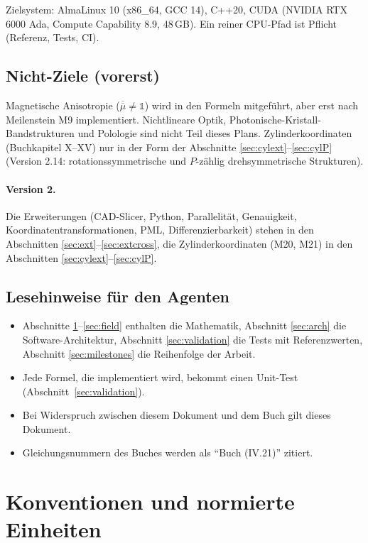 Zielsystem: AlmaLinux 10 (x86\_64, GCC 14), C++20, CUDA (NVIDIA RTX 6000 Ada,
Compute Capability 8.9, 48\,GB). Ein reiner CPU-Pfad ist Pflicht (Referenz, Tests, CI).

\subsection{Nicht-Ziele (vorerst)}
Magnetische Anisotropie ($\overline{\overline\mu}\neq\mathbb 1$) wird in den Formeln mitgeführt, aber erst
nach Meilenstein M9 implementiert. Nichtlineare Optik, Photonische-Kristall-Bandstrukturen
und Polologie sind nicht Teil dieses Plans. Zylinderkoordinaten (Buchkapitel X--XV) nur in der Form der
Abschnitte \ref{sec:cylext}--\ref{sec:cylP} (Version 2.14: rotationssymmetrische und $P$-zählig drehsymmetrische Strukturen).

\paragraph{Version 2.} Die Erweiterungen (CAD-Slicer, Python, Parallelität, Genauigkeit, Koordinatentransformationen,
PML, Differenzierbarkeit) stehen in den Abschnitten \ref{sec:ext}--\ref{sec:extcross}, die Zylinderkoordinaten
(M20, M21) in den Abschnitten \ref{sec:cylext}--\ref{sec:cylP}.

\subsection{Lesehinweise für den Agenten}
\begin{itemize}[nosep]
  \item Abschnitte \ref{sec:conv}--\ref{sec:field} enthalten die Mathematik, Abschnitt
        \ref{sec:arch} die Software-Architektur, Abschnitt \ref{sec:validation} die Tests mit
        Referenzwerten, Abschnitt \ref{sec:milestones} die Reihenfolge der Arbeit.
  \item Jede Formel, die implementiert wird, bekommt einen Unit-Test (Abschnitt~\ref{sec:validation}).
  \item Bei Widerspruch zwischen diesem Dokument und dem Buch gilt dieses Dokument.
  \item Gleichungsnummern des Buches werden als \enquote{Buch (IV.21)} zitiert.
\end{itemize}

\section{Konventionen und normierte Einheiten}\label{sec:conv}

